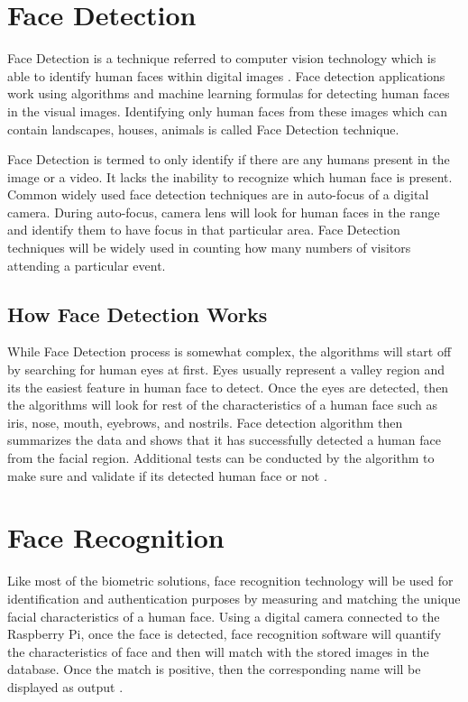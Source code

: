 \documentclass[sigconf]{acmart}
\begin{document}
\section{Face Detection}
Face Detection is a technique referred to computer vision technology which is able to 
identify human faces within digital images \cite{divya2013}. Face detection applications 
work using algorithms and machine learning formulas for detecting human faces in the visual 
images. Identifying only human faces from these images which can contain landscapes, houses, 
animals is called Face Detection technique.

Face Detection is termed to only identify if there are any humans present in the image or 
a video. It lacks the inability to recognize which human face is present. Common widely 
used face detection techniques are in auto-focus of a digital camera. During auto-focus, 
camera lens will look for human faces in the range and identify them to have focus in that 
particular area.
Face Detection techniques will be widely used in counting how many numbers of visitors 
attending a particular event.

\subsection{How Face Detection Works}
While Face Detection process is somewhat complex, the algorithms will start off by searching 
for human eyes at first. Eyes usually represent a valley region and its the easiest feature 
in human face to detect. Once the eyes are detected, then the algorithms will look for rest 
of the characteristics of a human face such as iris, nose, mouth, eyebrows, and nostrils. 
Face detection algorithm then summarizes the data and shows that it has successfully detected 
a human face from the facial region. Additional tests can be conducted by the algorithm to 
make sure and validate if its detected human face or not \cite{jesse2017}.

\section{Face Recognition}
Like most of the biometric solutions, face recognition technology will be used for identification 
and authentication purposes by measuring and matching the unique facial characteristics of a 
human face. Using a digital camera connected to the Raspberry Pi, once the face is detected, 
face recognition software will quantify the characteristics of face and then will match with 
the stored images in the database. Once the match is positive, then the corresponding name 
will be displayed as output \cite{biometrics2016}.
\end{document}
